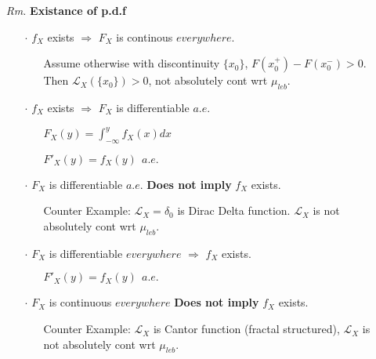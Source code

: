 \documentclass[a4paper,12pt,twoside]{book}
\begin{document}
\begin{itemize}
	\item[\textit{Rm.}] \textbf{Existance of p.d.f}
	\begin{itemize}
		\item[$\cdot$] $f_X$ exists $\Rightarrow$ $F_X$ is continous $everywhere$.
			\begin{itemize}
				\item[] Assume otherwise with discontinuity $\{x_0\}$, $F(x_0^+)-F(x_0^-)>0$. Then $\mathcal{L}_X(\{x_0\})>0$, not absolutely cont wrt $\mu_{leb}$.
			\end{itemize}

		\item[$\cdot$] $f_X$ exists $\Rightarrow$ $F_X$ is differentiable $a.e.$
		\begin{itemize}
			\item[] $F_X(y)=\int_{-\infty}^y f_X(x)dx$
			\item[] $F'_X(y)=f_X(y)~~a.e.$
		\end{itemize}

		\item[$\cdot$] $F_X$ is differentiable $a.e.$ \textbf{Does not imply} $f_X$ exists.
		\begin{itemize}
			\item[] Counter Example: $\mathcal{L}_X=\delta_0$ is Dirac Delta function. $\mathcal{L}_X$ is not absolutely cont wrt $\mu_{leb}$.
		\end{itemize}

		\item[$\cdot$] $F_X$ is differentiable $everywhere$ $\Rightarrow$ $f_X$ exists.
		\begin{itemize}
			\item[] $F'_X(y)=f_X(y)~~a.e.$
		\end{itemize}

		\item[$\cdot$] $F_X$ is continuous $everywhere$ \textbf{Does not imply} $f_X$ exists.
		\begin{itemize}
			\item[] Counter Example: $\mathcal{L}_X$ is Cantor function (fractal structured), $\mathcal{L}_X$ is not absolutely cont wrt $\mu_{leb}$.
		\end{itemize}
	\end{itemize}
\end{itemize}

\end{document}
